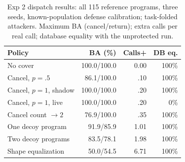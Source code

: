 \begin{table}[t]\centering\footnotesize\setlength{\tabcolsep}{3pt}
\caption{Exp 2 dispatch results: all 115 reference programs, three seeds, known-population defense calibration; task-folded attackers. Maximum BA (cancel/return); extra calls per real call; database equality with the unprotected run.}\label{tab:r7-e6}
\begin{tabularx}{\columnwidth}{@{}Yrrr@{}}\toprule
Policy & BA (\%) & Calls+ & DB eq.\\\midrule
No cover & 100.0/100.0 & 0.00 & 100\%\\
Cancel, $p=.5$ & 86.1/100.0 & .10 & 100\%\\
Cancel, $p=1$, shadow & 100.0/100.0 & .20 & 100\%\\
Cancel, $p=1$, live & 100.0/100.0 & .20 & 0\%\\
Cancel count $\to2$ & 76.9/100.0 & .35 & 100\%\\
One decoy program & 91.9/85.9 & 1.01 & 100\%\\
Two decoy programs & 83.5/78.1 & 1.98 & 100\%\\
Shape equalization & 50.0/54.5 & 6.71 & 100\%\\\bottomrule
\end{tabularx}\end{table}
